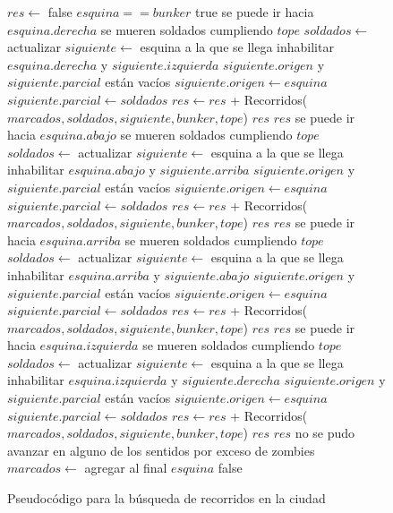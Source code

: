 \begin{figure}[!ht]
\begin{codebox}
\li $res \leftarrow$ false
\li \If $esquina == bunker$
\li 		\Do \Return true
		\End
\li 	\If se puede ir hacia $esquina.derecha$
\li 		\Do \If se mueren soldados cumpliendo $tope$
\li				\Do 
					$soldados \leftarrow$ actualizar
				\End
\li			$siguiente \leftarrow$ esquina a la que se llega
\li			inhabilitar $esquina.derecha$ y $siguiente.izquierda$
\li			\If $siguiente.origen$ y $siguiente.parcial$ están vacíos
\li				\Do
					$siguiente.origen \leftarrow esquina$
\li					$siguiente.parcial \leftarrow soldados$
				\End
\li			$res \leftarrow res$ + {\sc Recorridos}($marcados,soldados,siguiente,bunker,tope$)
\li			\If $res$ 
\li				\Do \Return $res$
				\End
		\End
\li 	\If se puede ir hacia $esquina.abajo$
\li 		\Do \If se mueren soldados cumpliendo $tope$
\li				\Do 
					$soldados \leftarrow$ actualizar
				\End
\li			$siguiente \leftarrow$ esquina a la que se llega
\li			inhabilitar $esquina.abajo$ y $siguiente.arriba$
\li			\If $siguiente.origen$ y $siguiente.parcial$ están vacíos
\li				\Do
					$siguiente.origen \leftarrow esquina$
\li					$siguiente.parcial \leftarrow soldados$
				\End
\li			$res \leftarrow res$ + {\sc Recorridos}($marcados,soldados,siguiente,bunker,tope$)
\li			\If $res$ 
\li				\Do \Return $res$
				\End
		\End
\li 	\If se puede ir hacia $esquina.arriba$
\li 		\Do \If se mueren soldados cumpliendo $tope$
\li				\Do 
					$soldados \leftarrow$ actualizar
				\End
\li			$siguiente \leftarrow$ esquina a la que se llega
\li			inhabilitar $esquina.arriba$ y $siguiente.abajo$
\li			\If $siguiente.origen$ y $siguiente.parcial$ están vacíos
\li				\Do
					$siguiente.origen \leftarrow esquina$
\li					$siguiente.parcial \leftarrow soldados$
				\End
\li			$res \leftarrow res$ + {\sc Recorridos}($marcados,soldados,siguiente,bunker,tope$)
\li			\If $res$ 
\li				\Do \Return $res$
				\End
		\End		
\li 	\If se puede ir hacia $esquina.izquierda$
\li 		\Do \If se mueren soldados cumpliendo $tope$
\li				\Do 
					$soldados \leftarrow$ actualizar
				\End
\li			$siguiente \leftarrow$ esquina a la que se llega
\li			inhabilitar $esquina.izquierda$ y $siguiente.derecha$
\li			\If $siguiente.origen$ y $siguiente.parcial$ están vacíos
\li				\Do
					$siguiente.origen \leftarrow esquina$
\li					$siguiente.parcial \leftarrow soldados$
				\End
\li			$res \leftarrow res$ + {\sc Recorridos}($marcados,soldados,siguiente,bunker,tope$)
\li			\If $res$ 
\li				\Do \Return $res$
				\End
		\End
\li \If no se pudo avanzar en alguno de los sentidos por exceso de zombies
\li 		\Do 	$marcados \leftarrow$ agregar al final $esquina$
		\End
\li \Return false
\end{codebox} 
\caption{Pseudocódigo para la búsqueda de recorridos en la ciudad}\label{code:zombieland.rec}
\end{figure}
\FloatBarrier

